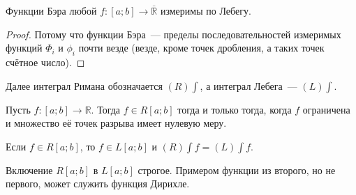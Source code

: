 \documentclass{article}
\begin{document}
    \begin{corollary}
        Функции Бэра любой $f\colon[a;b]\to\overline{\mathbb R}$ измеримы по Лебегу.
    \end{corollary}
    \begin{proof}
        Потому что функции Бэра~--- пределы последовательностей измеримых функций $\Phi_i$ и $\phi_i$ почти везде (везде, кроме точек дробления, а таких точек счётное число).
    \end{proof}
    \begin{remark}
        Далее интеграл Римана обозначается $(R)\!\int$, а интеграл Лебега~--- $(L)\!\int$.
    \end{remark}
    \begin{theorem}
        \label{Критерий Лебега}
        Пусть $f\colon[a;b]\to\mathbb R$. Тогда $f\in R[a;b]$ тогда и только тогда, когда $f$ ограничена и множество её точек разрыва имеет нулевую меру.
    \end{theorem}
    \begin{theorem}
        \label{Сравнение интегралов Римана и Лебега}
        Если $f\in R[a;b]$, то $f\in L[a;b]$ и $(R)\!\int f=(L)\!\int f$.
    \end{theorem}
    \begin{remark}
        Включение $R[a;b]$ в $L[a;b]$ строгое. Примером функции из второго, но не первого, может служить функция Дирихле.
    \end{remark}
\end{document}
